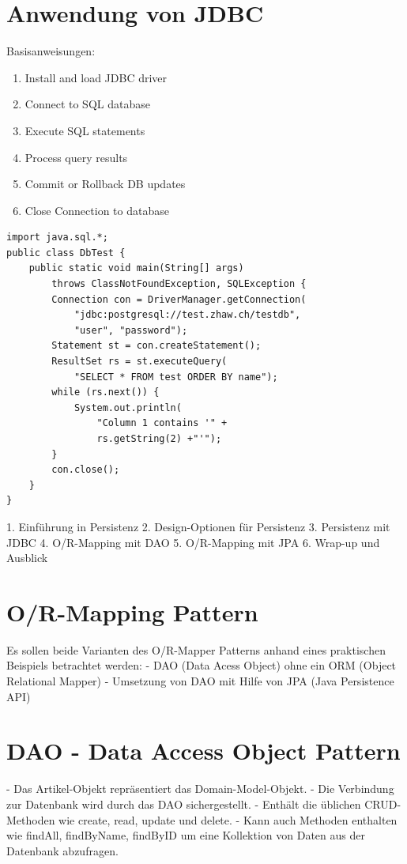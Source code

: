 \section*{Anwendung von JDBC}
Basisanweisungen:

\begin{enumerate}
  \item Install and load JDBC driver
  \item Connect to SQL database
  \item Execute SQL statements
  \item Process query results
  \item Commit or Rollback DB updates
  \item Close Connection to database
\end{enumerate}

\begin{verbatim}
import java.sql.*;
public class DbTest {
    public static void main(String[] args)
        throws ClassNotFoundException, SQLException {
        Connection con = DriverManager.getConnection(
            "jdbc:postgresql://test.zhaw.ch/testdb",
            "user", "password");
        Statement st = con.createStatement();
        ResultSet rs = st.executeQuery(
            "SELECT * FROM test ORDER BY name");
        while (rs.next()) {
            System.out.println(
                "Column 1 contains '" +
                rs.getString(2) +"'");
        }
        con.close();
    }
}

  \end{verbatim}

1. Einführung in Persistenz
2. Design-Optionen für Persistenz
3. Persistenz mit JDBC
4. O/R-Mapping mit DAO
5. O/R-Mapping mit JPA
6. Wrap-up und Ausblick

\section*{O/R-Mapping Pattern}

Es sollen beide Varianten des O/R-Mapper Patterns anhand eines praktischen Beispiels betrachtet werden:
- DAO (Data Acess Object) ohne ein ORM (Object Relational Mapper)
- Umsetzung von DAO mit Hilfe von JPA (Java Persistence API)

\section*{DAO - Data Access Object Pattern}
- Das Artikel-Objekt repräsentiert das Domain-Model-Objekt.
- Die Verbindung zur Datenbank wird durch das DAO sichergestellt.
- Enthält die üblichen CRUD-Methoden wie create, read, update und delete.
- Kann auch Methoden enthalten wie findAll, findByName, findByID um eine Kollektion von Daten aus der Datenbank abzufragen.

